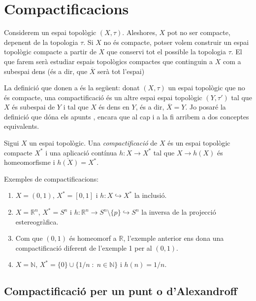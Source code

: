 \documentclass[../main.tex]{subfiles}
\begin{document}
\section{Compactificacions} 

Considerem un espai topològic $(X,\tau)$. Aleshores, $X$ pot no ser compacte, depenent de la topologia $\tau$. Si $X$ no és compacte, potser volem construir un espai topològic compacte a partir de $X$ que conservi tot el possible la topologia $\tau$. El que farem serà estudiar espais topològics compactes que continguin a $X$ com a subespai dens (és a dir, que $\overline{X}$ serà tot l'espai)

La definició que donen a \cite{mathonline} és la següent: donat $(X,\tau)$ un espai topològic que no és compacte, una compactificació és un altre espai espai topològic $(Y,\tau')$ tal que $X$ és subespai de $Y$ i tal que $X$ és dens en $Y$, és a dir, $\overline{X}=Y$. Jo posaré la definició que dóna els apunts \cite{naranjo}, encara que al cap i a la fi arribem a dos conceptes equivalents.

\begin{defi}
[Compactificació]\label{def:compactificacio} Sigui $X$ un espai topològic. Una \textit{compactificació} de $X$ és un espai topològic compacte $X^*$ i una aplicació contínua $h:X\rightarrow X^*$ tal que $X\rightarrow h(X)$ és homeomorfisme i $\overline{h(X)} = X^*$.
\end{defi}

\begin{ej}
\label{ej:compactificacions} Exemples de compactificacions:
\begin{enumerate}[(1)]
    \item $X = (0,1)$, $X^* = [0,1]$ i $h:X\hookrightarrow X^*$ la inclusió.
    \item $X = \mathbb{R}^n$, $X^* = S^n$ i $h:\mathbb{R}^n\rightarrow S^n\setminus\{p\}\hookrightarrow S^n$ la inversa de la projecció estereogràfica.
    \item Com que $(0,1)$ és homeomorf a $\mathbb{R}$, l'exemple anterior ens dona una compactificació diferent de l'exemple 1 per al $(0,1)$.
    \item $X = \mathbb{N}$, $X^*=\{0\}\cup\{1/n \;:\;n\in\mathbb{N}\}$ i $h(n) = 1/n$.
\end{enumerate}
\end{ej}


\subsection{Compactificació per un punt o d'Alexandroff}
\end{document}
